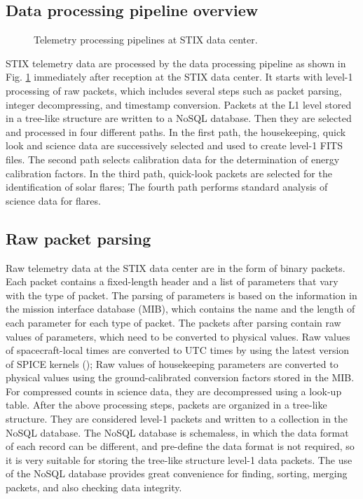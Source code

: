 \documentclass[referee]{aa} %
\begin{document}
\subsection{Data processing pipeline overview}

\begin{figure}
    \centering
    \caption{Telemetry processing pipelines at STIX data center.}
    \label{fig:main_pipelines}
\end{figure}
STIX telemetry data are processed by the data processing pipeline  
as shown in Fig. \ref{fig:main_pipelines} immediately after reception at the STIX data center.  It starts with level-1 processing of raw packets, which includes several steps such as  packet parsing,  integer decompressing, and timestamp conversion. 
Packets at the L1 level stored in a tree-like structure  are written to a NoSQL database. Then they are selected and processed in four different paths. 
In the first path, the housekeeping, quick look and science data are successively selected and used to create level-1 FITS files. 
The second path selects calibration data for the determination
 of energy calibration factors.   In the third path, quick-look packets are selected  for the identification of solar  flares; 
The fourth path performs standard analysis of science data for flares.

\subsection{Raw packet parsing}
Raw telemetry data at the STIX data center are in the form of binary packets. 
Each packet contains a fixed-length header and a list of parameters that vary with the type of packet.  The parsing of parameters is based on the information in 
the mission interface database (MIB), which contains the name and the 
length of each parameter for each type of packet. 
The packets after parsing contain raw values of parameters, 
which need to be converted to physical values. 
Raw values of spacecraft-local times are converted to UTC times by using 
the latest version of SPICE kernels (\cite{spice1996,spice2018});
Raw values of  housekeeping parameters are converted to physical values using 
the  ground-calibrated conversion factors stored in the MIB. 
For compressed counts in science data, they are decompressed using a look-up table. 
After the above processing steps, packets are organized in a tree-like structure. 
They are considered level-1 packets and written to a collection in the NoSQL database. 
The NoSQL database is schemaless, in which the data format of each record can be different, and pre-define the data format is not required, so it is very suitable for storing the tree-like structure level-1 data packets.  
The use of the NoSQL database provides great convenience for finding, sorting, merging packets, and also checking data integrity. 
\end{document}
